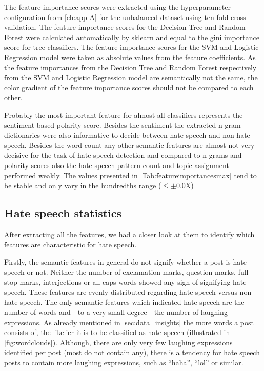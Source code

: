 The feature importance scores were extracted using the hyperparameter configuration from \ref{ch:app-A} for the unbalanced dataset using ten-fold cross validation. The feature importance scores for the Decision Tree and Random Forest were calculated automatically by sklearn and equal to the gini importance score for tree classifiers. The feature importance scores for the SVM and Logistic Regression model were taken as absolute values from the feature coefficients. As the feature importances from the Decision Tree and Random Forest respectively from the SVM and Logistic Regression model are semantically not the same, the color gradient of the feature importance scores should not be compared to each other.

Probably the most important feature for almost all classifiers represents the sentiment-based polarity score. Besides the sentiment the extracted n-gram dictionaries were also informative to decide between hate speech and non-hate speech. Besides the word count any other semantic features are almost not very decisive for the task of hate speech detection and compared to n-grams and polarity scores also the hate speech pattern count and topic assignment performed weakly. The values presented in \autoref{Tab:featureimportancesmax} tend to be stable and only vary in the hundredths range ($\le \pm$0.0X)

\subsection{Hate speech statistics}
\label{ch:experimentDb}

After extracting all the features, we had a closer look at them to identify which features are characteristic for hate speech.

Firstly, the semantic features in general do not signify whether a post is hate speech or not. Neither the number of exclamation marks, question marks, full stop marks, interjections or all caps words showed any sign of signifying hate speech. These features are evenly distributed regarding hate speech versus non-hate speech.
The only semantic features which indicated hate speech are the number of words and - to a very small degree - the number of laughing expressions.
As already mentioned in \autoref{sec:data_insights} the more words a post consists of, the likelier it is to be classified as hate speech (illustrated in \autoref{fig:wordclouds}).
Although, there are only very few laughing expressions identified per post (most do not contain any), there is a tendency for hate speech posts to contain more laughing expressions, such as \enquote{haha}, \enquote{lol} or similar.

